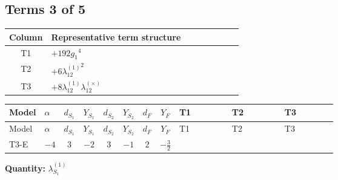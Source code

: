 \documentclass[8pt]{article}
\begin{document}
\begin{landscape}
\subsection*{Terms 3 of 5}
\begin{center}
\begin{tabular}{@{}c >{\raggedright\arraybackslash}p{0.82\linewidth}@{}}
\toprule
Column & Representative term structure \\
\midrule
T1 & \(\displaystyle +192 {g_1}^4\) \\
\midrule
T2 & \(\displaystyle +6 {\lambda_{12}^{(1)}}^2\) \\
\midrule
T3 & \(\displaystyle +8 {\lambda_{12}^{(1)}} {\lambda_{12}^{(\times)}}\) \\
\midrule
\bottomrule
\end{tabular}
\end{center}
\smallskip
\tiny
\begin{longtable}{@{}llcccccc >{\raggedright\arraybackslash}p{0.21\linewidth} >{\raggedright\arraybackslash}p{0.21\linewidth} >{\raggedright\arraybackslash}p{0.21\linewidth}@{}}
\toprule
Model & $\alpha$ & $d_{S_1}$ & $Y_{S_1}$ & $d_{S_2}$ & $Y_{S_2}$ & $d_F$ & $Y_F$ & T1 & T2 & T3 \\
\midrule
\endfirsthead
\toprule
Model & $\alpha$ & $d_{S_1}$ & $Y_{S_1}$ & $d_{S_2}$ & $Y_{S_2}$ & $d_F$ & $Y_F$ & T1 & T2 & T3 \\
\midrule
\endhead
T3-E & $-4$ & $3$ & $-2$ & $3$ & $-1$ & $2$ & $-\frac{3}{2}$ & \scriptsize\adjustbox{max width=\linewidth}{$\begin{gathered} +192 {g_1}^4\end{gathered}$} & \scriptsize\adjustbox{max width=\linewidth}{$\begin{gathered} +6 {\lambda_{12}^{(1)}}^2\end{gathered}$} & \scriptsize\adjustbox{max width=\linewidth}{$\begin{gathered} +8 {\lambda_{12}^{(1)}} {\lambda_{12}^{(\times)}}\end{gathered}$} \\
\midrule
\bottomrule
\end{longtable}
\clearpage
\noindent\textbf{Quantity: }$\lambda_{S_1}^{(1)}$\par\smallskip

\end{landscape}
\end{document}
